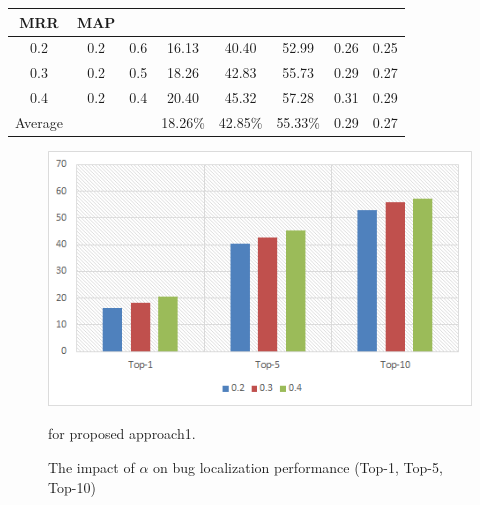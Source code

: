 \documentclass[conference]{IEEEtran}
\begin{document}
\begin{table}[htbp]
{\begin{tabular}{c|c|c|c|c|c|c|c}
			 \textbf{MRR}  & 
			 \textbf{MAP}  \\
			 \hline
			{0.2} 
			& 0.2 &0.6                                                                                                                                               & 16.13                                               & 40.40                                            & 52.99                                                &   0.26  & 0.25    \\ \hline
			{0.3} 
			& 0.2  &0.5                                                                    & 18.26                                               & 42.83                                              & 55.73                                             &   0.29  &   0.27  \\ 
			\hline
			
			{0.4}  & 0.2
			& 0.4
			&20.40 &
			45.32 &
			57.28 & 0.31 &
			0.29     \\  
			\hline
			{Average}      
			&                                                                              &                                           & 18.26\%                                                 & 42.85\%                                                 & 55.33\%                                                  &     0.29 &  0.27    \\ 
			\hline
\end{tabular}}
\centering
\end{table}
\begin{figure}
	\centering
	\includegraphics[scale=0.80]{Performance-rvsm+simi+co}
	\caption{The impact of $\alpha$ on bug localization performance (Top-1, Top-5, Top-10)} for proposed approach1.
	\label{fig:PerformanceTopK}
\end{figure}
\end{document}
